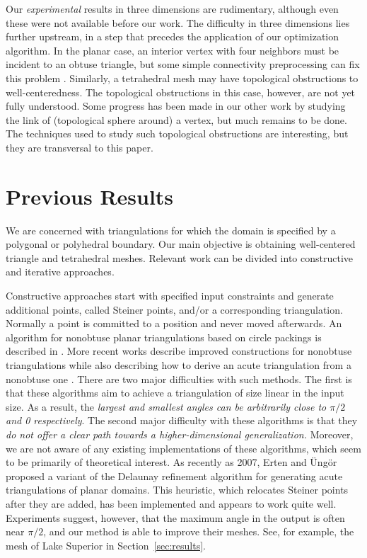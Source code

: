 \documentclass[final]{siamltex}
\begin{document}
Our \emph{experimental} results in three dimensions are rudimentary,
although even these
were not available before our work.  The difficulty in three
dimensions lies further upstream, in a step that precedes the
application of our optimization algorithm. In the planar case, an
interior vertex with four neighbors must be incident to an obtuse
triangle, but some simple connectivity preprocessing can fix this
problem \cite{VaHiGuRa2007}. Similarly, a tetrahedral mesh may have
topological obstructions to well-centeredness.  The topological
obstructions in this case, however, are not yet fully understood.
Some progress has been made in our other work \cite{VaHiGuRaZh2008} by
studying the link of (topological sphere around) a vertex, but much
remains to be done.  The techniques used to study such topological
obstructions are interesting, but they are transversal to this paper.


\section{Previous Results}
\label{sec:prevWork}
We are concerned with triangulations for which the domain is specified
by a polygonal or polyhedral boundary.  Our main objective is
obtaining well-centered triangle and tetrahedral meshes.  Relevant
work can be divided into constructive and iterative approaches.

Constructive approaches start with specified input constraints and
generate additional points, called Steiner points, and/or a
corresponding triangulation. Normally a point is committed to a
position and never moved afterwards. An algorithm for nonobtuse planar
triangulations based on circle packings is described in
\cite{BeMiRu1994}.  More recent works describe improved constructions
for nonobtuse triangulations while also describing how to derive an
acute triangulation from a nonobtuse one \cite{Maehara2002,
  Yuan2005}. There are two major difficulties with such
  methods. The first is that these algorithms aim to achieve a
  triangulation of size linear in the input size. As a result, the
  \emph{largest and smallest angles can be arbitrarily close to
    $\pi/2$ and 0 respectively}. The second major difficulty with
  these algorithms is that they \emph{do not offer a clear path
    towards a higher-dimensional generalization.} Moreover, we are
not aware of any existing implementations of these algorithms, which
seem to be primarily of theoretical interest.  As recently as 2007,
Erten and \"Ung\"or \cite{ErUn2007} proposed a variant of the Delaunay
refinement algorithm for generating acute triangulations of planar
domains.  This
heuristic, which relocates Steiner points after they
are added, has been implemented and appears to work quite well.
Experiments suggest, however, that the maximum angle in the output is
often near $\pi/2$, and our method is able to improve their meshes.
See, for example, the mesh of Lake Superior in
Section~\ref{sec:results}.
\end{document}
